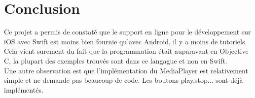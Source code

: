 \section{Conclusion}
Ce projet a permis de constaté que le support en ligne pour le développement sur iOS avec Swift est moins bien fournie qu'avec Android, il y a moins de tutoriels. Cela vient surement du fait que la programmation était auparavant en Objective C, la plupart des exemples trouvés sont dans ce langague et non en Swift.\\
Une autre observation est que l'implémentation du MediaPlayer est relativement simple et ne demande pas beaucoup de code. Les boutons play,stop... sont déjà implémentés.